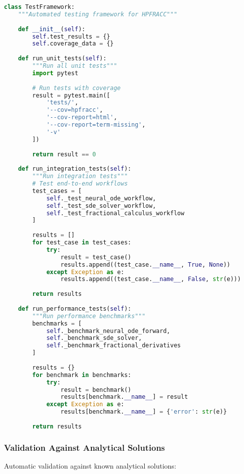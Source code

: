 \begin{lstlisting}[language=Python, caption=Testing Framework]
class TestFramework:
    """Automated testing framework for HPFRACC"""
    
    def __init__(self):
        self.test_results = {}
        self.coverage_data = {}
    
    def run_unit_tests(self):
        """Run all unit tests"""
        import pytest
        
        # Run tests with coverage
        result = pytest.main([
            'tests/',
            '--cov=hpfracc',
            '--cov-report=html',
            '--cov-report=term-missing',
            '-v'
        ])
        
        return result == 0
    
    def run_integration_tests(self):
        """Run integration tests"""
        # Test end-to-end workflows
        test_cases = [
            self._test_neural_ode_workflow,
            self._test_sde_solver_workflow,
            self._test_fractional_calculus_workflow
        ]
        
        results = []
        for test_case in test_cases:
            try:
                result = test_case()
                results.append((test_case.__name__, True, None))
            except Exception as e:
                results.append((test_case.__name__, False, str(e)))
        
        return results
    
    def run_performance_tests(self):
        """Run performance benchmarks"""
        benchmarks = [
            self._benchmark_neural_ode_forward,
            self._benchmark_sde_solver,
            self._benchmark_fractional_derivatives
        ]
        
        results = {}
        for benchmark in benchmarks:
            try:
                result = benchmark()
                results[benchmark.__name__] = result
            except Exception as e:
                results[benchmark.__name__] = {'error': str(e)}
        
        return results
\end{lstlisting}

\subsubsection{Validation Against Analytical Solutions}

Automatic validation against known analytical solutions:

